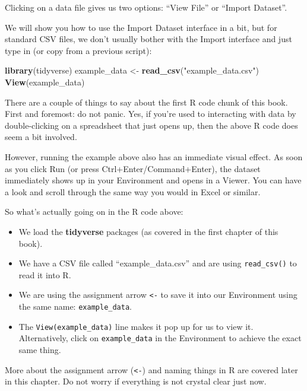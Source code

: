\documentclass[
  12pt,
  krantz2]{krantz}
\makeatletter
\newenvironment{Shaded}{\begin{snugshade}}{\end{snugshade}}
\newcommand{\KeywordTok}[1]{\textcolor[rgb]{0.13,0.29,0.53}{\textbf{#1}}}
\newcommand{\NormalTok}[1]{#1}
\newcommand{\StringTok}[1]{\textcolor[rgb]{0.31,0.60,0.02}{#1}}
\providecommand{\tightlist}{%
  \setlength{\itemsep}{0pt}\setlength{\parskip}{0pt}}
\newenvironment{kframe}{%
\medskip{}
\setlength{\fboxsep}{.8em}
 \def\at@end@of@kframe{}%
 \ifinner\ifhmode%
  \def\at@end@of@kframe{\end{minipage}}%
  \begin{minipage}{\columnwidth}%
 \fi\fi%
 \def\FrameCommand##1{\hskip\@totalleftmargin \hskip-\fboxsep
 \colorbox{shadecolor}{##1}\hskip-\fboxsep
     \hskip-\linewidth \hskip-\@totalleftmargin \hskip\columnwidth}%
 \MakeFramed {\advance\hsize-\width
   \@totalleftmargin\z@ \linewidth\hsize
   \@setminipage}}%
 {\par\unskip\endMakeFramed%
 \at@end@of@kframe}
\renewenvironment{Shaded}{\begin{kframe}}{\end{kframe}}
\makeatother
\begin{document}
Clicking on a data file gives us two options: ``View File'' or ``Import Dataset''.

We will show you how to use the Import Dataset interface in a bit, but for standard CSV files, we don't usually bother with the Import interface and just type in (or copy from a previous script):

\begin{Shaded}
\begin{Highlighting}[]
\KeywordTok{library}\NormalTok{(tidyverse)}
\NormalTok{example_data <-}\StringTok{ }\KeywordTok{read_csv}\NormalTok{(}\StringTok{"example_data.csv"}\NormalTok{)}
\KeywordTok{View}\NormalTok{(example_data)}
\end{Highlighting}
\end{Shaded}

There are a couple of things to say about the first R code chunk of this book.
First and foremost: do not panic.
Yes, if you're used to interacting with data by double-clicking on a spreadsheet that just opens up, then the above R code does seem a bit involved.

However, running the example above also has an immediate visual effect.
As soon as you click Run (or press Ctrl+Enter/Command+Enter), the dataset immediately shows up in your Environment and opens in a Viewer.
You can have a look and scroll through the same way you would in Excel or similar.

So what's actually going on in the R code above:

\begin{itemize}
\tightlist
\item
  We load the \textbf{tidyverse} packages (as covered in the first chapter of this book).
\item
  We have a CSV file called ``example\_data.csv'' and are using \texttt{read\_csv()} to read it into R.
\item
  We are using the assignment arrow \texttt{\textless{}-} to save it into our Environment using the same name: \texttt{example\_data}.
\item
  The \texttt{View(example\_data)} line makes it pop up for us to view it. Alternatively, click on \texttt{example\_data} in the Environment to achieve the exact same thing.
\end{itemize}

More about the assignment arrow (\texttt{\textless{}-}) and naming things in R are covered later in this chapter.
Do not worry if everything is not crystal clear just now.
\end{document}
